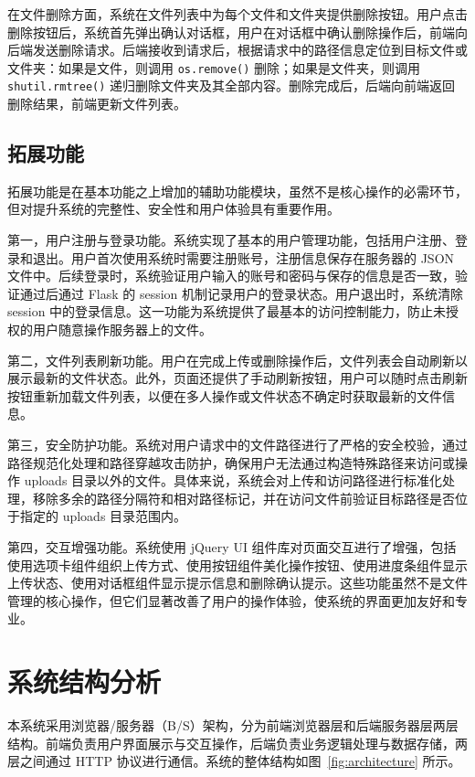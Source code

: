\documentclass[UTF8,zihao=-4]{ctexrep}
\begin{document}
在文件删除方面，系统在文件列表中为每个文件和文件夹提供删除按钮。用户点击删除按钮后，系统首先弹出确认对话框，用户在对话框中确认删除操作后，前端向后端发送删除请求。后端接收到请求后，根据请求中的路径信息定位到目标文件或文件夹：如果是文件，则调用 \texttt{os.remove()} 删除；如果是文件夹，则调用 \texttt{shutil.rmtree()} 递归删除文件夹及其全部内容。删除完成后，后端向前端返回删除结果，前端更新文件列表。

\subsection{拓展功能}

拓展功能是在基本功能之上增加的辅助功能模块，虽然不是核心操作的必需环节，但对提升系统的完整性、安全性和用户体验具有重要作用。

第一，用户注册与登录功能。系统实现了基本的用户管理功能，包括用户注册、登录和退出。用户首次使用系统时需要注册账号，注册信息保存在服务器的 JSON 文件中。后续登录时，系统验证用户输入的账号和密码与保存的信息是否一致，验证通过后通过 Flask 的 session 机制记录用户的登录状态。用户退出时，系统清除 session 中的登录信息。这一功能为系统提供了最基本的访问控制能力，防止未授权的用户随意操作服务器上的文件。

第二，文件列表刷新功能。用户在完成上传或删除操作后，文件列表会自动刷新以展示最新的文件状态。此外，页面还提供了手动刷新按钮，用户可以随时点击刷新按钮重新加载文件列表，以便在多人操作或文件状态不确定时获取最新的文件信息。

第三，安全防护功能。系统对用户请求中的文件路径进行了严格的安全校验，通过路径规范化处理和路径穿越攻击防护，确保用户无法通过构造特殊路径来访问或操作 uploads 目录以外的文件。具体来说，系统会对上传和访问路径进行标准化处理，移除多余的路径分隔符和相对路径标记，并在访问文件前验证目标路径是否位于指定的 uploads 目录范围内。

第四，交互增强功能。系统使用 jQuery UI 组件库对页面交互进行了增强，包括使用选项卡组件组织上传方式、使用按钮组件美化操作按钮、使用进度条组件显示上传状态、使用对话框组件显示提示信息和删除确认提示。这些功能虽然不是文件管理的核心操作，但它们显著改善了用户的操作体验，使系统的界面更加友好和专业。

\section{系统结构分析}

本系统采用浏览器/服务器（B/S）架构，分为前端浏览器层和后端服务器层两层结构。前端负责用户界面展示与交互操作，后端负责业务逻辑处理与数据存储，两层之间通过 HTTP 协议进行通信。系统的整体结构如图~\ref{fig:architecture} 所示。
\end{document}
